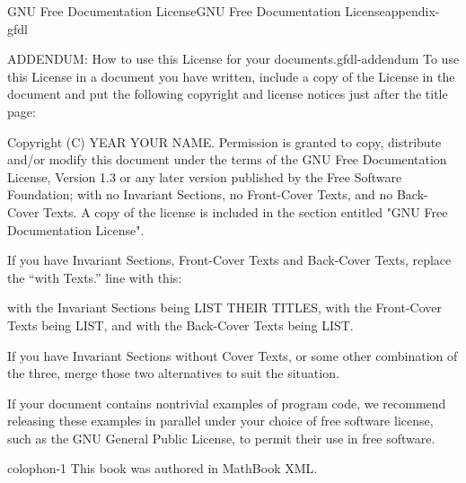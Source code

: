 \documentclass[oneside,10pt,]{book}
\numberwithin{equation}{section}
\begin{document}
\begin{appendixptx}{GNU Free Documentation License}{}{GNU Free Documentation License}{}{}{appendix-gfdl}
\begin{paragraphs}{ADDENDUM: How to use this License for your documents.}{gfdl-addendum}%
\hypertarget{p-762}{}%
To use this License in a document you have written, include a copy of the License in the document and put the following copyright and license notices just after the title page:%
\begin{preformatted}
Copyright (C)  YEAR  YOUR NAME.
Permission is granted to copy, distribute and/or modify this document
under the terms of the GNU Free Documentation License, Version 1.3
or any later version published by the Free Software Foundation;
with no Invariant Sections, no Front-Cover Texts, and no Back-Cover Texts.
A copy of the license is included in the section entitled "GNU
Free Documentation License".
\end{preformatted}
\hypertarget{p-763}{}%
If you have Invariant Sections, Front-Cover Texts and Back-Cover Texts, replace the ``with\textellipsis{} Texts.'' line with this:%
\begin{preformatted}
with the Invariant Sections being LIST THEIR TITLES, with the
Front-Cover Texts being LIST, and with the Back-Cover Texts being LIST.
\end{preformatted}
\hypertarget{p-764}{}%
If you have Invariant Sections without Cover Texts, or some other combination of the three, merge those two alternatives to suit the situation.%
\par
\hypertarget{p-765}{}%
If your document contains nontrivial examples of program code, we recommend releasing these examples in parallel under your choice of free software license, such as the GNU General Public License, to permit their use in free software.%
\end{paragraphs}%
\end{appendixptx}
%
\backmatter
%
%
\printindex
%
\cleardoublepage
\pagestyle{empty}
\begin{backcolophon}{colophon-1}%
\hypertarget{p-766}{}%
This book was authored in MathBook XML.%
\end{backcolophon}%
\end{document}
